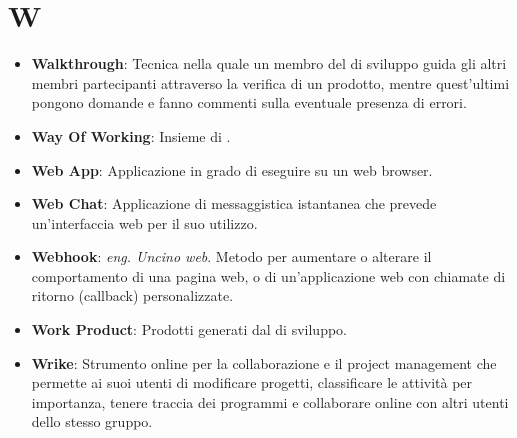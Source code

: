 \section*{W}
\begin{itemize}
	\item
	\textbf{Walkthrough}: Tecnica nella quale un membro del  di sviluppo guida gli altri membri partecipanti attraverso la verifica di un prodotto, mentre quest'ultimi pongono domande e fanno commenti sulla eventuale presenza di errori.
	\item
	\textbf{Way Of Working}: Insieme di .
	\item
	\textbf{Web App}: Applicazione in grado di eseguire su un web browser.
	\item
	\textbf{Web Chat}: Applicazione di messaggistica istantanea che prevede un'interfaccia web per il suo utilizzo.
	\item
	\textbf{Webhook}: \textit{eng. Uncino web}. Metodo per aumentare o alterare il comportamento di una pagina web, o di un'applicazione web con chiamate di ritorno (callback) personalizzate.
	\item
	\textbf{Work Product}: Prodotti generati dal  di sviluppo.
	\item
	\textbf{Wrike}: Strumento online per la collaborazione e il project management che permette ai suoi utenti di modificare progetti, classificare le attività per importanza, tenere traccia dei programmi e collaborare online con altri utenti dello stesso gruppo.
\end{itemize}
\newpage